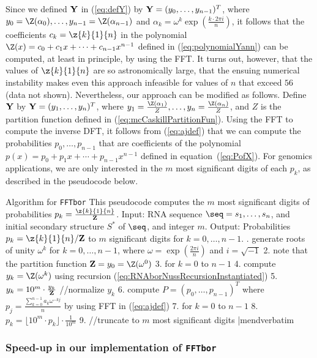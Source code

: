 Since we defined $\bf Y$ in (\ref{eq:defY}) by ${\bf Y} =
(y_0,\ldots,y_{n-1})^T$, where
$y_0=\Z(\alpha_0),\ldots, y_{n-1}=\Z(\alpha_{n-1})$ and $\alpha_k = \omega^k
\exp(\frac{k \cdot 2\pi i}{n})$, it follows that the coefficients
$c_k=\z{k}{1}{n}$ in the polynomial
$\Z(x) = c_0 + c_1 x + \cdots + c_{n-1} x^{n-1}$ defined in
(\ref{eq:polynomialYann}) can be computed, at least in principle,
by using the FFT. It turns out, however, that the values of
$\z{k}{1}{n}$ are so astronomically large, that the ensuing numerical
instability makes even this approach infeasible for values of $n$
that exceed $56$ (data not shown).
Nevertheless, our approach can be modified as follows.
Define $\bf Y$ by ${\bf Y} = (y_1,\ldots,y_n)^T$, where
$y_1=\frac{\Z(\alpha_1)}{Z},\ldots, y_{n}=\frac{\Z(\alpha_{n})}{Z}$, and
$Z$ is the partition function defined in (\ref{eq:mcCaskillPartitionFun}).
Using the FFT to compute the inverse DFT, it follows from
(\ref{eq:ajdef}) that we can compute the probabilities $p_0,\ldots,p_{n-1}$
that are coefficients of the polynomial
$p(x)=p_0+p_1 x + \cdots + p_{n-1}x^{n-1}$
defined in equation~(\ref{eq:PofX}). For genomics applications, we are
only interested in the $m$ most significant digits of each $p_k$, as described
in the pseudocode below.
\medskip

\noindent
{\sc Algorithm} for {\tt FFTbor}\hfill\break
This pseudocode computes the $m$ most significant digits
of probabilities $p_k = \frac{\z{k}{1}{n}}{{\bf Z}}$. \hfill\break
{\sc Input:} RNA sequence $\seq=s_1,\ldots,s_n$, and initial secondary
structure $S^*$ of $\seq$, and integer $m$. \hfill\break
{\sc Output:} Probabilities $p_k=\z{k}{1}{n}/{\bf Z}$ to $m$ significant digits for $k=0,\ldots,n-1$. \hfill\break
\smallskip
{}.  generate roots of unity $\omega^k$ for $k=0,\ldots,n-1$, where $\omega=\exp(\frac{2 \pi i}{n})$ and $i=\sqrt{-1}$
2.  note that the partition function ${\bf Z}=y_0=\Z(\omega^0)$
3.  for $k=0$ to $n-1$
4.    compute $y_k = \Z(\omega^k)$ using recursion (\ref{eq:RNAborNussRecursionInstantiated})
5.    $y_k = 10^m \cdot \frac{y_k}{{\bf Z}}$ //normalize $y_k$
6.  compute $P = (p_0,\ldots,p_{n-1})^T$ where $p_j =\frac{\sum_{k=0}^{n-1} a_k \omega^{-kj}}{n}$ by using FFT in (\ref{eq:ajdef})
7.  for $k=0$ to $n-1$
8.    $p_k = \lfloor 10^m \cdot p_k \rfloor \cdot \frac{1}{10^m}$
9.    //truncate to $m$ most significant digits
|mendverbatim
\medskip

\subsubsection*{Speed-up in our implementation of {\tt FFTbor}}

